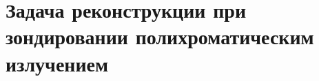 \documentclass[12pt]{beamer}
\begin{document}
\section{Задача реконструкции при зондировании полихроматическим излучением}

\end{document}
